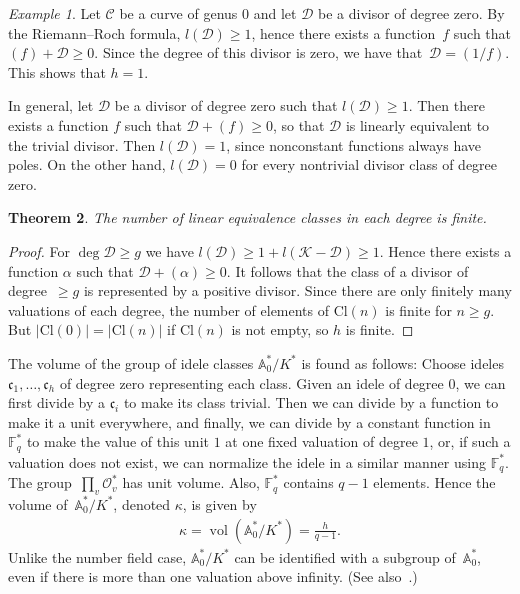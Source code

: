 \documentclass{amsart}
\newcommand\vol{\operatorname{vol}}
\newcommand\F{\mathbb{F}}
\newcommand\oo{\mathcal{O}}
\newcommand\Curve{\mathcal{C}}
\newcommand\A{\mathbb{A}}
\newcommand\calD{\mathcal{D}}	\newcommand\calK{\mathcal{K}}
\newcommand\Pic{\mathrm{Cl}}
\newcommand\cid{\mathfrak{c}}
\newtheorem{theorem}{Theorem}[section]
\theoremstyle{definition}\newtheorem{definition}[theorem]{Definition}
\theoremstyle{remark}\newtheorem{remark}[theorem]{Remark}
\newtheorem{example}[theorem]{Example}\newtheorem{exercise}[theorem]{Exercise}
\numberwithin{equation}{section}
\begin{document}
\begin{example}\label{E:P1}
Let $\Curve$ be a curve of genus $0$ and let $\calD$ be a divisor of degree zero.
By the Riemann--Roch formula,
$l(\calD)\geq1$,
hence there exists a function~$f$ such that $(f)+\calD\geq0$.
Since the degree of this divisor is zero,
we have that~$\calD=(1/f)$.
This shows that $h=1$.

In general,
let $\calD$ be a divisor of degree zero such that $l(\calD)\geq1$.
Then there exists a function $f$ such that $\calD+(f)\geq0$,
so that $\calD$ is linearly equivalent to the trivial divisor.
Then $l(\calD)=1$,
since nonconstant functions always have poles.
On the other hand,
 $l(\calD)=0$ for every nontrivial divisor class of degree zero.
\end{example}

\begin{theorem}
The number of linear equivalence classes in each degree is finite.
\end{theorem}

\begin{proof}
For $\deg\calD\geq g$ we have $l(\calD)\geq1+l(\calK-\calD)\geq1$.
Hence there exists a function $\alpha$ such that $\calD+(\alpha)\geq0$.
It follows that the class of a divisor of degree~$\geq g$ is represented by a positive divisor.
Since there are only finitely many valuations of each degree,
the number of elements of $\Pic(n)$ is finite for $n\geq g$.
But $|\Pic(0)|=|\Pic(n)|$ if $\Pic(n)$ is not empty,
so $h$ is finite.
\end{proof}

The volume of the group of idele classes $\A^*_0/K^*$ is found as follows:
Choose ideles $\cid_1,\dots,\cid_h$ of degree zero representing each class.
Given an idele of degree $0$,
we can first divide by a $\cid_i$ to make its class trivial.
Then we can divide by a function to make it a unit everywhere,
and finally,
we can divide by a constant function in~$\F_q^*$ to make the value of this unit $1$ at one fixed valuation of degree $1$,
or,
if such a valuation does not exist,
we can normalize the idele in a similar manner using $\F_q^*$.
The group~$\prod_v\oo_v^*$ has unit volume.
Also,
$\F_q^*$ contains $q-1$ elements.
Hence the volume of~$\A^*_0/K^*$,
denoted $\kappa$,
 is given by
\begin{gather}\label{E: kappa}
\kappa=\vol(\A^*_0/K^*)=\frac{h}{q-1}.
\end{gather}
Unlike the number field case,
$\A^*_0/K^*$ can be identified with a subgroup of~$\A^*_0$,
even if there is more than one valuation above infinity.
(See also~\cite[Section~4.3]{Tate}.)
\end{document}
